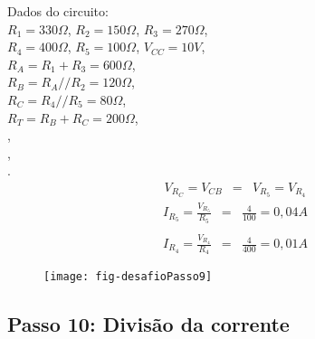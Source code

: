 \begin{minipage}{\linewidth}
  \centering
  \begin{minipage}{0.45\linewidth}
    Dados do circuito: \\
                $R_1 = 330\Omega$,
                $R_2 = 150\Omega$,
                $R_3 = 270\Omega$, \\
                $R_4 = 400\Omega$,
                $R_5 = 100\Omega$,
                $V_{CC} = 10V$, \\
                $R_A = R_1 + R_3 = 600\Omega$, \\
                $R_B = R_A // R_2 = 120\Omega$, \\
                $R_C = R_4 // R_5 = 80\Omega$, \\
                $R_T = R_B + R_C = 200\Omega$, \\
                ,\\
                ,\\
                .
    \begin{eqnarray}
      V_{R_C} = V_{CB} & = & V_{R_5} = V_{R_4} \nonumber
    \end{eqnarray}
    \color{blue}
    \vspace{-10mm}
    \begin{eqnarray}
      I_{R_5} = \frac{V_{R_5}}{R_5} & = & \frac{4}{100} = 0,04 A \nonumber\\
      \nonumber\\
      I_{R_4} = \frac{V_{R_4}}{R_4} & = & \frac{4}{400} = 0,01 A \nonumber
    \end{eqnarray}
  \end{minipage}
  \hspace{0.05\linewidth}
  \begin{minipage}{0.45\linewidth}
    \begin{figure}[H]
      \centering
      \texttt{[image: fig-desafioPasso9]}
    \end{figure}
  \end{minipage}
\end{minipage}








\subsection{Passo 10: Divisão da corrente}

